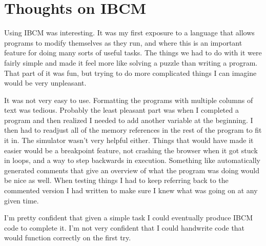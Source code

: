 \documentclass{article}
\begin{document}
\section{Thoughts on IBCM}
Using IBCM was interesting. It was my first exposure to a language that allows programs to modify themselves as they run, and where this is an important feature for doing many sorts of useful tasks. The things we had to do with it were fairly simple and made it feel more like solving a puzzle than writing a program. That part of it was fun, but trying to do more complicated things I can imagine would be very unpleasant.

It was not very easy to use. Formatting the programs with multiple columns of text was tedious. Probably the least pleasant part was when I completed a program and then realized I needed to add another variable at the beginning. I then had to readjust all of the memory references in the rest of the program to fit it in. The simulator wasn't very helpful either. Things that would have made it easier would be a breakpoint feature, not crashing the browser when it got stuck in loops, and a way to step backwards in execution. Something like automatically generated comments that give an overview of what the program was doing would be nice as well. When testing things I had to keep referring back to the commented version I had written to make sure I knew what was going on at any given time.

I'm pretty confident that given a simple task I could eventually produce IBCM code to complete it. I'm not very confident that I could handwrite code that would function correctly on the first try.
\end{document}
